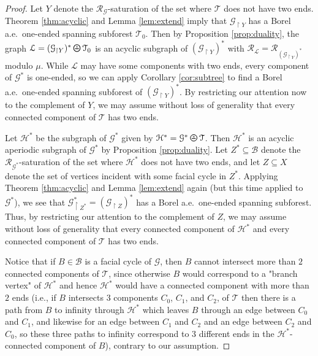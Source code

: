 \documentclass[11pt]{amsart}
\theoremstyle{definition}
\theoremstyle{plain}
\newcommand{\<}{\langle}
\renewcommand{\>}{\rangle}
\newcommand{\mc}[1]{\mathcal{#1}}
\newcommand{\Ggraph}{\mathcal{G}}
\newcommand{\Hgraph}{\mathcal{H}}
\newcommand{\Tgraph}{\mathcal{T}}
\newcommand\RR{\mathscr{R}}
\newcommand{\oPerpStar}{\begin{tikzpicture}[scale=0.134]
\draw[thick,line width=0.7pt](-0.6,-0.2)--(0.6,-0.2) ;
    \draw (0,0.1) node[scale=0.6] {\rm{*}};
  \draw[line width=0.7pt] (0,0) circle [radius=1];
\end{tikzpicture}}
\newcommand{\oPerpstar}{\mathbin{\raisebox{-1pt}{\oPerpStar}}}
\begin{document}
\begin{proof}
Let $Y$ denote the $\RR_{\Ggraph}$-saturation of the set where ${\Tgraph}$ does not have two ends. Theorem \ref{thm:acyclic} and Lemma \ref{lem:extend} imply that ${\Ggraph}_{\restriction Y}$ has a Borel a.e.\ one-ended spanning subforest $\Tgraph _0$. Then by Proposition \ref{prop:duality}, the graph $\mathcal{L} = ({\Ggraph}_{\restriction Y}) ^* \oPerpstar  \Tgraph _0$ is an acyclic subgraph of $({\Ggraph_{\restriction Y}})^*$ with $\RR_{\mathcal{L}} = \RR_{{(\Ggraph_{\restriction Y})}^*}$ modulo $\mu$. While $\mathcal{L}$ may have some components with two ends, every component of ${\Ggraph}^*$ is one-ended, so we can apply Corollary \ref{cor:subtree} to find a Borel a.e.\ one-ended spanning subforest of $(\Ggraph_{\restriction Y} )^*$. By restricting our attention now to the complement of $Y$, we may assume without loss of generality that every connected component of $\Tgraph$ has two ends.


Let ${\Hgraph}^*$ be the subgraph of ${\Ggraph}^*$ given by ${\Hgraph}^* = {\Ggraph}^* \oPerpstar  \Tgraph$. Then ${\Hgraph}^*$ is an acyclic aperiodic subgraph of ${\Ggraph}^*$ by Proposition \ref{prop:duality}. Let $Z^*\subseteq \mathcal{B}$ denote the $\RR_{{\Ggraph}^*}$-saturation of the set where ${\Hgraph}^*$ does not have two ends, and let $Z\subseteq X$ denote the set of vertices incident with some facial cycle in $Z^*$. Applying Theorem \ref{thm:acyclic} and Lemma \ref{lem:extend} again (but this time applied to $\Ggraph ^*$), we see that ${\Ggraph}^*_{\restriction Z^*} = (\Ggraph_{\restriction Z} )^*$ has a Borel a.e.\ one-ended spanning subforest. Thus, by restricting our attention to the complement of $Z$, we may assume without loss of generality that every connected component of ${\Hgraph}^*$ and every connected component of $\Tgraph$ has two ends.

Notice that if $B\in \mc{B}$ is a facial cycle of ${\Ggraph}$, then $B$ cannot intersect more than $2$ connected components of ${\Tgraph}$, since otherwise $B$ would correspond to a "branch vertex" of ${\Hgraph}^*$ and hence ${\Hgraph}^*$ would have a connected component with more than $2$ ends (i.e., if $B$ intersects $3$ components $C_0$, $C_1$, and $C_2$, of ${\Tgraph}$ then there is a path from $B$ to infinity through ${\Hgraph}^*$ which leaves $B$ through an edge between $C_0$ and $C_1$, and likewise for an edge between $C_1$ and $C_2$ and an edge between $C_2$ and $C_0$, so these three paths to infinity correspond to 3 different ends in the ${\Hgraph}^*$-connected component of $B$), contrary to our assumption.


\end{proof}
\end{document}
